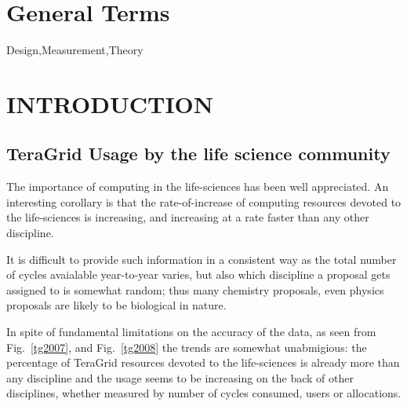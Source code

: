 \documentclass{sig-alternate}
\begin{document}



\section*{General Terms}{Design,Measurement,Theory}






\section{INTRODUCTION}

\subsection{TeraGrid Usage by the life science community}

The importance of computing in the life-sciences has been well
appreciated. An interesting corollary is that the rate-of-increase of
computing resources devoted to the life-sciences is increasing, and
increasing at a rate faster than any other discipline. 

It is difficult to provide such information in a consistent way
as the total number of cycles avaialable year-to-year varies, but
also which discipline a proposal gets assigned to is somewhat
random; thus many chemistry proposals, even physics proposals
are likely to be biological in nature. 

In spite of fundamental limitations on the accuracy of the data,
as seen from Fig.~\ref{tg2007}, and Fig.~\ref{tg2008} the trends are somewhat
unabmigious: the percentage of TeraGrid resources devoted
to the life-sciences is already more than any discipline and
the usage seems to be increasing on the back of other disciplines, 
whether measured by number of cycles consumed, users or 
allocations.
\end{document}
